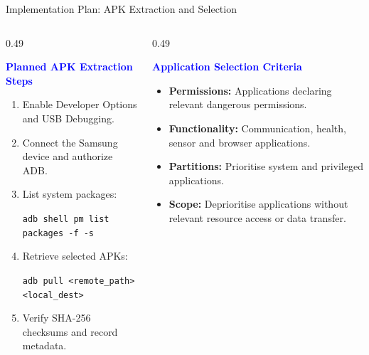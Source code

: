 \documentclass[aspectratio=169,10pt]{beamer}
\newcommand{\hd}[1]{\textbf{\textcolor{blue}{#1}}}
\begin{document}
\begin{frame}{Implementation Plan: APK Extraction and Selection}

\begin{columns}[T]

\begin{column}{0.49\textwidth}

\hd{Planned APK Extraction Steps}

\begin{enumerate}

    \item Enable Developer Options and USB Debugging.

    \item Connect the Samsung device and authorize ADB.

    \item List system packages:

    {\footnotesize
    \texttt{adb shell pm list packages -f -s}
    }

    \item Retrieve selected APKs:

    {\footnotesize
    \texttt{adb pull <remote\_path> <local\_dest>}
    }

    \item Verify SHA-256 checksums and record metadata.

\end{enumerate}

\end{column}

\begin{column}{0.49\textwidth}

\hd{Application Selection Criteria}

\begin{itemize}

    \item \textbf{Permissions:}
    Applications declaring relevant dangerous permissions.

    \item \textbf{Functionality:}
    Communication, health, sensor and browser applications.

    \item \textbf{Partitions:}
    Prioritise system and privileged applications.

    \item \textbf{Scope:}
    Deprioritise applications without relevant resource access or data transfer.

\end{itemize}

\end{column}

\end{columns}

\end{frame}
\end{document}
